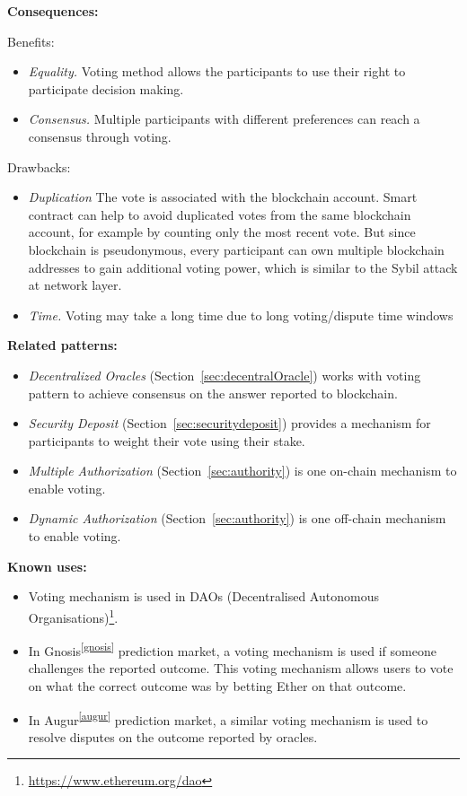 \vspace{0.5em}\noindent \textbf{Consequences:} 

Benefits:
\begin{itemize}
  \item \textit{Equality.} Voting method allows the participants to use their right to participate decision making. 
  \item \textit{Consensus.} Multiple participants with different preferences can reach a consensus through voting.
\end{itemize}


Drawbacks: 
\begin{itemize}
  \item \textit{Duplication} The vote is associated with the blockchain account. Smart contract can help to avoid duplicated votes from the same blockchain account, for example by counting only the most recent vote. But since blockchain is pseudonymous, every participant can own multiple blockchain addresses to gain additional voting power, which is similar to the Sybil attack at network layer.  
  \item \textit{Time.} Voting may take a long time due to long voting/dispute time windows
\end{itemize}


\vspace{0.5em}\noindent \textbf{Related patterns:}
\begin{itemize}
    \item \textit{Decentralized Oracles} (Section~\ref{sec:decentralOracle}) works with voting pattern to achieve consensus on the answer reported to blockchain.
   \item \textit{Security Deposit} (Section~\ref{sec:securitydeposit}) provides a mechanism for participants to weight their vote using their stake. 
    \item \textit{Multiple Authorization} (Section~\ref{sec:authority}) is one on-chain mechanism to enable voting. 
    \item \textit{Dynamic Authorization} (Section~\ref{sec:authority}) is one off-chain mechanism to enable voting. 
\end{itemize}



\vspace{0.5em}\noindent \textbf{Known uses:}
\begin{itemize}
  \item Voting mechanism is used in DAOs (Decentralised Autonomous Organisations)\footnote{\url{https://www.ethereum.org/dao}}.
  \item In Gnosis\textsuperscript{\ref{gnosis}} prediction market, a voting mechanism is used if someone challenges the reported outcome. This voting mechanism allows users to vote on what the correct outcome was by betting Ether on that outcome. 
  \item In Augur\textsuperscript{\ref{augur}} prediction market, a similar voting mechanism is used to resolve disputes on the outcome reported by oracles.
\end{itemize}


